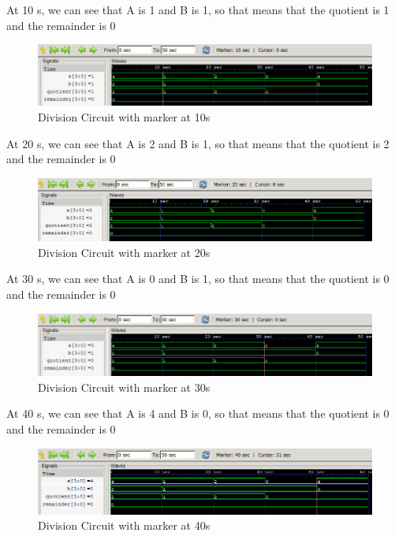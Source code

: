 \documentclass[12pt]{article}
\begin{document}
At 10 s, we can see that A is 1 and B is 1, so that means that the quotient is 1 and the remainder is 0
\begin{figure}[h]
    \centering
    \includegraphics[width = 1.0\textwidth]{figs/Div10.png}
    \caption{Division Circuit with marker at 10s}
    \label{fig:enter-label}
\end{figure}

At 20 s, we can see that A is 2 and B is 1, so that means that the quotient is 2 and the remainder is 0
\begin{figure}[h]
    \centering
    \includegraphics[width = 1.0\textwidth]{figs/Div20.png}
    \caption{Division Circuit with marker at 20s}
    \label{fig:enter-label}
\end{figure}

\newpage

At 30 s, we can see that A is 0 and B is 1, so that means that the quotient is 0 and the remainder is 0
\begin{figure}[h]
    \centering
    \includegraphics[width = 1.0\textwidth]{figs/Div30.png}
    \caption{Division Circuit with marker at 30s}
    \label{fig:enter-label}
\end{figure}

At 40 s, we can see that A is 4 and B is 0, so that means that the quotient is 0 and the remainder is 0
\begin{figure}[h]
    \centering
    \includegraphics[width = 1.0\textwidth]{figs/Div40.png}
    \caption{Division Circuit with marker at 40s}
    \label{fig:enter-label}
\end{figure}
\end{document}
